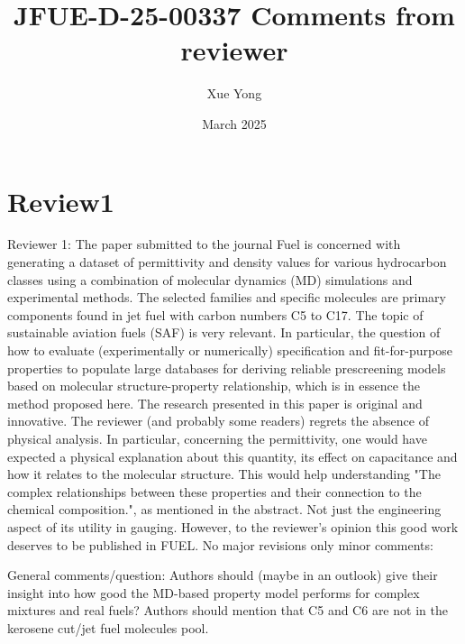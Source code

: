 \documentclass{article}
\title{JFUE-D-25-00337 Comments from reviewer}
\author{Xue Yong}
\date{March 2025}
\begin{document}
\maketitle

\section{Review1}
Reviewer 1: The paper submitted to the journal Fuel is concerned with generating a dataset of permittivity and density values for various hydrocarbon classes using a combination of molecular dynamics (MD) simulations and experimental methods. The selected families and specific molecules are primary components found in jet fuel with carbon numbers C5 to C17.
The topic of sustainable aviation fuels (SAF) is very relevant. In particular, the question of how to evaluate (experimentally or numerically) specification and fit-for-purpose properties to populate large databases for deriving reliable prescreening models based on molecular structure-property relationship, which is in essence the method proposed here.
The research presented in this paper is original and innovative. The reviewer (and probably some readers) regrets the absence of physical analysis. In particular, concerning the permittivity, one would have expected a physical explanation about this quantity, its effect on capacitance and how it relates to the molecular structure. This would help understanding "The complex relationships between these properties and their connection to the chemical composition.", as mentioned in the abstract.  Not just the engineering aspect of its utility in gauging.
However, to the reviewer's opinion this good work deserves to be published in FUEL. No major revisions only minor comments:

General comments/question:
Authors should (maybe in an outlook) give their insight into how good the MD-based property model performs for complex mixtures and real fuels?
Authors should mention that C5 and C6 are not in the kerosene cut/jet fuel molecules pool.
\end{document}
